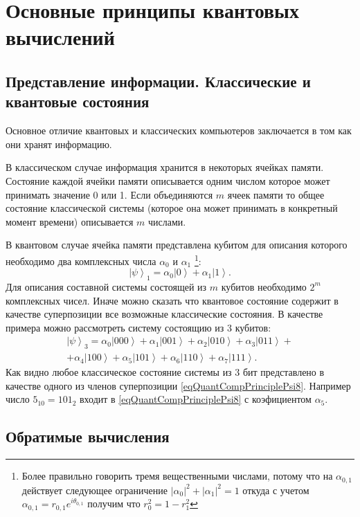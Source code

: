\section{Основные принципы квантовых вычислений}

\subsection{Представление информации. Классические и квантовые
  состояния}
Основное отличие квантовых и классических компьютеров заключается в
том как они хранят информацию. 

В классическом случае информация хранится в некоторых ячейках
памяти. Состояние каждой ячейки памяти описывается одним числом
которое может принимать значение 0 или 1. Если объединяются $m$ ячеек
памяти то общее состояние классической системы (которое она может
принимать в конкретный момент времени) описывается $m$ числами.

В квантовом случае ячейка памяти представлена кубитом для описания
которого необходимо два комплексных числа $\alpha_0$ и $\alpha_1$
\footnote{Более правильно говорить тремя вещественными числами, потому
что на $\alpha_{0,1}$ действует следующее ограничение 
$\left|\alpha_0\right|^2 + \left|\alpha_1\right|^2 = 1$ откуда с
учетом $\alpha_{0,1} = r_{0,1}e^{i \theta_{0,1}}$ получим что $r_0^2 =
1 - r_1^2$}:
\[
\left|\psi\right>_1 = \alpha_0 \left| 0 \right> + \alpha_1 \left| 1 \right>.
\]
Для описания составной системы состоящей из $m$ кубитов необходимо
$2^m$ комплексных чисел. Иначе можно сказать что квантовое состояние
содержит в качестве суперпозиции все возможные классические
состояния. В качестве примера можно рассмотреть систему состоящию из 3
кубитов:
\begin{eqnarray}
\left|\psi\right>_3 = 
\alpha_0 \left| 000 \right> + 
\alpha_1 \left| 001 \right> + 
\alpha_2 \left| 010 \right> + 
\alpha_3 \left| 011 \right> + 
\nonumber \\
+ 
\alpha_4 \left| 100 \right> + 
\alpha_5 \left| 101 \right> + 
\alpha_6 \left| 110 \right> + 
\alpha_7 \left| 111 \right>.
\label{eqQuantCompPrinciplePsi8}
\end{eqnarray}
Как видно любое классическое состояние системы из 3 бит представлено в
качестве одного из членов суперпозиции
\eqref{eqQuantCompPrinciplePsi8}. Например число $5_{10}=101_2$ входит
в \eqref{eqQuantCompPrinciplePsi8} с коэфициентом $\alpha_5$.

\subsection{Обратимые вычисления}

